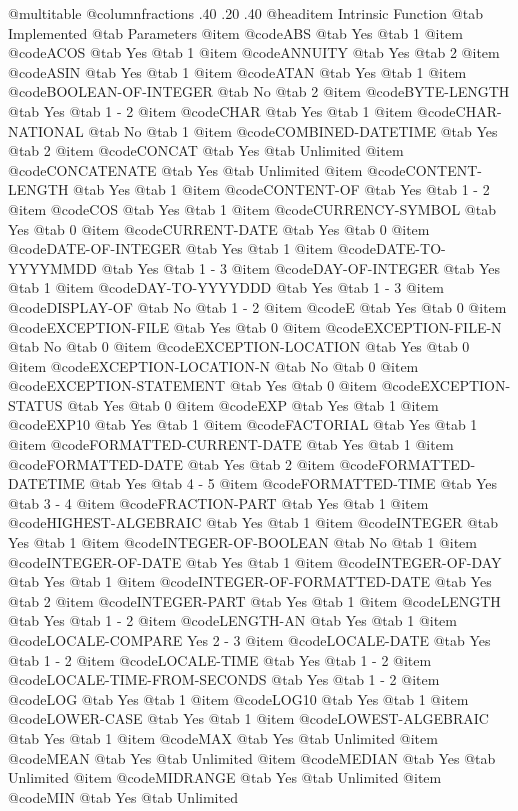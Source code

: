 @multitable @columnfractions .40 .20 .40
@headitem Intrinsic Function @tab Implemented @tab	Parameters
@item @code{ABS} @tab Yes @tab 1
@item @code{ACOS} @tab Yes @tab 1
@item @code{ANNUITY} @tab Yes @tab 2
@item @code{ASIN} @tab Yes @tab 1
@item @code{ATAN} @tab Yes @tab 1
@item @code{BOOLEAN-OF-INTEGER} @tab No @tab 2
@item @code{BYTE-LENGTH} @tab Yes @tab 1 - 2
@item @code{CHAR} @tab Yes @tab 1
@item @code{CHAR-NATIONAL} @tab No @tab 1
@item @code{COMBINED-DATETIME} @tab Yes @tab 2
@item @code{CONCAT} @tab Yes @tab Unlimited
@item @code{CONCATENATE} @tab Yes @tab Unlimited
@item @code{CONTENT-LENGTH} @tab Yes @tab 1
@item @code{CONTENT-OF} @tab Yes @tab 1 - 2
@item @code{COS} @tab Yes @tab 1
@item @code{CURRENCY-SYMBOL} @tab Yes @tab 0
@item @code{CURRENT-DATE} @tab Yes @tab 0
@item @code{DATE-OF-INTEGER} @tab Yes @tab 1
@item @code{DATE-TO-YYYYMMDD} @tab Yes @tab 1 - 3
@item @code{DAY-OF-INTEGER} @tab Yes @tab 1
@item @code{DAY-TO-YYYYDDD} @tab Yes @tab 1 - 3
@item @code{DISPLAY-OF} @tab No @tab 1 - 2
@item @code{E} @tab Yes @tab 0
@item @code{EXCEPTION-FILE} @tab Yes @tab 0
@item @code{EXCEPTION-FILE-N} @tab No @tab 0
@item @code{EXCEPTION-LOCATION} @tab Yes @tab 0
@item @code{EXCEPTION-LOCATION-N} @tab No @tab 0
@item @code{EXCEPTION-STATEMENT} @tab Yes @tab 0
@item @code{EXCEPTION-STATUS} @tab Yes @tab 0
@item @code{EXP} @tab Yes @tab 1
@item @code{EXP10} @tab Yes @tab 1
@item @code{FACTORIAL} @tab Yes @tab 1
@item @code{FORMATTED-CURRENT-DATE} @tab Yes @tab 1
@item @code{FORMATTED-DATE} @tab Yes @tab 2
@item @code{FORMATTED-DATETIME} @tab Yes @tab 4 - 5
@item @code{FORMATTED-TIME} @tab Yes @tab 3 - 4
@item @code{FRACTION-PART} @tab Yes @tab 1
@item @code{HIGHEST-ALGEBRAIC} @tab Yes @tab 1
@item @code{INTEGER} @tab Yes @tab 1
@item @code{INTEGER-OF-BOOLEAN} @tab No @tab 1
@item @code{INTEGER-OF-DATE} @tab Yes @tab 1
@item @code{INTEGER-OF-DAY} @tab Yes @tab 1
@item @code{INTEGER-OF-FORMATTED-DATE} @tab Yes @tab 2
@item @code{INTEGER-PART} @tab Yes @tab 1
@item @code{LENGTH} @tab Yes @tab 1 - 2
@item @code{LENGTH-AN} @tab Yes @tab 1
@item @code{LOCALE-COMPARE	Yes	2 - 3}
@item @code{LOCALE-DATE} @tab Yes @tab 1 - 2
@item @code{LOCALE-TIME} @tab Yes @tab 1 - 2
@item @code{LOCALE-TIME-FROM-SECONDS} @tab Yes @tab 1 - 2
@item @code{LOG} @tab Yes @tab 1
@item @code{LOG10} @tab Yes @tab 1
@item @code{LOWER-CASE} @tab Yes @tab 1
@item @code{LOWEST-ALGEBRAIC} @tab Yes @tab 1
@item @code{MAX} @tab Yes @tab Unlimited
@item @code{MEAN} @tab Yes @tab Unlimited
@item @code{MEDIAN} @tab Yes @tab Unlimited
@item @code{MIDRANGE} @tab Yes @tab Unlimited
@item @code{MIN} @tab Yes @tab Unlimited
